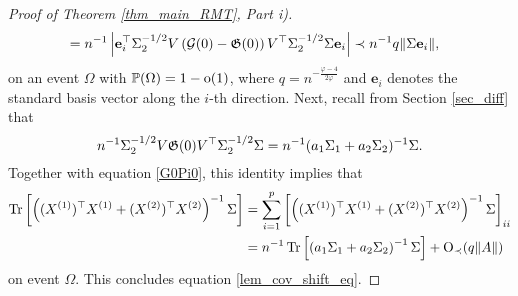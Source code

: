 \begin{proof}[Proof of Theorem \ref{thm_main_RMT}, Part i)]
\begin{align}
&=n^{-1} \left|\mathbf e_i^\top \Sigma_2^{-1/2}V \left(\mathcal G(0)-{\mathfrak G}(0)\right)V^\top\Sigma_2^{-1/2}\Sigma\mathbf e_i\right| \prec n^{-1}q\|\Sigma\mathbf e_i\| ,\label{G0Pi0}
\end{align}
on an event $\Omega$ with $\mathbb{P}(\Omega)=1-\operatorname{o}(1)$, where $ q= n^{-\frac{\varphi - 4}{2\varphi}}$ and $\mathbf e_i$ denotes the standard basis vector along the $i$-th direction.
Next, recall from Section \ref{sec_diff} that
$$ n^{-1}  \Sigma_2^{-1/2}V {\mathfrak G}(0)V^\top\Sigma_2^{-1/2}\Sigma= n^{-1}(a_1\Sigma_1 +  a_2\Sigma_2)^{-1}\Sigma.$$
Together with equation \eqref{G0Pi0}, this identity implies that %
\begin{align*}
 \operatorname{Tr} \left[\left((X^{(1)})^\top X^{(1)}+(X^{(2)})^\top X^{(2)}\right)^{-1}\Sigma\right]& = \sum_{i=1}^p\left[\left((X^{(1)})^\top X^{(1)}+(X^{(2)})^\top X^{(2)}\right)^{-1}\Sigma\right]_{ii} \\
 &= n^{-1}\operatorname{Tr} \left[ \left(a_1  \Sigma_1  +  a_2\Sigma_2\right)^{-1}\Sigma\right] +\operatorname{O}_\prec(q \|A\|) 
 \end{align*}
 on event $\Omega$.
This concludes equation \eqref{lem_cov_shift_eq}.  %
\end{proof}
 

